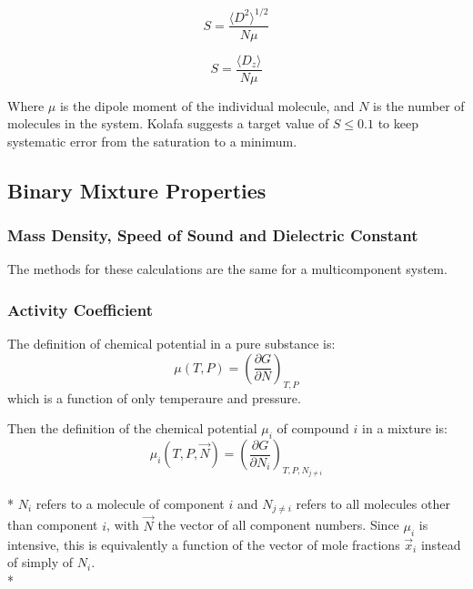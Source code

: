 \documentclass[9pt,bestpractices]{livecoms}
\begin{document}
\begin{equation} S= \frac{\langle D^2 \rangle^{1/2}}{N\mu} \end{equation}

\begin{equation} S = \frac{\langle D_z \rangle}{N\mu} \end{equation}

Where $\mu$ is the dipole moment of the individual molecule, and $N$ is the number of molecules in the system. Kolafa suggests a target value of $ S \leq 0.1$ to keep systematic error from the saturation to a minimum.



\subsection{Binary Mixture Properties} 
\subsubsection{Mass Density, Speed of Sound and Dielectric Constant}
The methods for these calculations are the same for a multicomponent system.


\subsubsection{Activity Coefficient}
The definition of chemical potential in a pure substance is:
\begin{equation}\mu(T,P) = \left(\frac{\partial G}{\partial N}\right)_{T,P}\end{equation}
which is a function of only temperaure and pressure.

Then the definition of the chemical potential $\mu_i$ of compound $i$ in a mixture is:
\begin{equation}\mu_{i}(T,P,\vec{N}) = \left(\frac{\partial G}{\partial N_{i}}\right)_{T,P,N_{j \neq i}}\end{equation}\\*
$N_i$ refers to a molecule of component $i$ and $N_{j \neq i}$ refers
to all molecules other than component $i$, with $\vec{N}$ the vector
of all component numbers. Since $\mu_i$ is intensive, this is
equivalently a function of the vector of mole fractions $\vec{x}_i$ instead of simply of $N_i$.\\*
\end{document}
